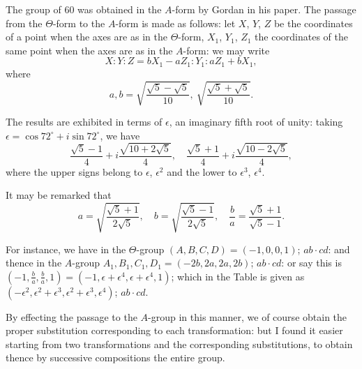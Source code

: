 \documentclass[11pt,a4paper]{book}
\begin{document}
\begin{art}
The group of 60 was obtained in the $A$-form by Gordan in his paper.
The passage from the $\Theta$-form to the $A$-form is made as follows: let
$X$, $Y$, $Z$ be the coordinates of a point when the axes are as in the
$\Theta$-form, $X_1$, $Y_1$, $Z_1$ the coordinates of the same point when the axes
are as in the $A$-form: we may write
\[
X : Y : Z = bX_1 - aZ_1 : Y_1 : aZ_1 + bX_1,
\]
where
\[
a, b = \sqrt{\frac{\sqrt{5}-\sqrt{5}}{10}},\ \sqrt{\frac{\sqrt{5}+\sqrt{5}}{10}}.
\]
\end{art}

\begin{art}
The results are exhibited in terms of $\epsilon$, an imaginary fifth root of
unity: taking $\epsilon = \cos 72^\circ + i\sin 72^\circ$, we have
\[
\frac{\sqrt{5}-1}{4} + i\frac{\sqrt{10+2\sqrt{5}}}{4}, \quad
\frac{\sqrt{5}+1}{4} + i\frac{\sqrt{10-2\sqrt{5}}}{4},
\]
where the upper signs belong to $\epsilon$, $\epsilon^2$ and the lower to $\epsilon^3$, $\epsilon^4$.

It may be remarked that
\[
a = \sqrt{\frac{\sqrt{5}+1}{2\sqrt{5}}}, \quad b = \sqrt{\frac{\sqrt{5}-1}{2\sqrt{5}}}, \quad
\frac{b}{a} = \frac{\sqrt{5}+1}{\sqrt{5}-1}.
\]

For instance, we have in the $\Theta$-group $(A, B, C, D) = (-1, 0, 0, 1)$;
$ab \cdot cd$: and thence in the $A$-group $A_1, B_1, C_1, D_1 = (-2b, 2a, 2a, 2b)$;
$ab \cdot cd$: or say this is $(-1, \frac{b}{a}, \frac{b}{a}, 1) = (-1, \epsilon + \epsilon^4, \epsilon + \epsilon^4, 1)$; which in the Table
is given as $(-\epsilon^2, \epsilon^2 + \epsilon^3, \epsilon^2 + \epsilon^3, \epsilon^4)$; $ab \cdot cd$.

By effecting the passage to the $A$-group in this manner, we of course
obtain the proper substitution corresponding to each transformation: but
I found it easier starting from two transformations and the corresponding
substitutions, to obtain thence by successive compositions the entire group.
\end{art}
\end{document}
